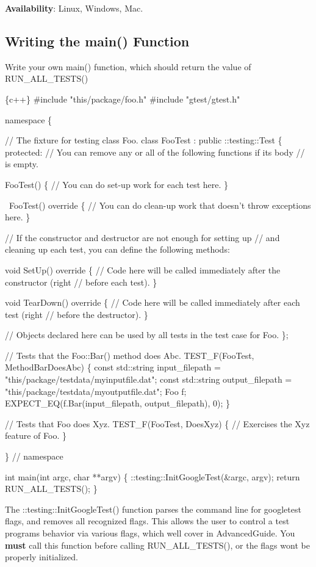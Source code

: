 {\bfseries Availability}\+: Linux, Windows, Mac.

\subsection*{Writing the main() Function}

Write your own main() function, which should return the value of {\ttfamily R\+U\+N\+\_\+\+A\+L\+L\+\_\+\+T\+E\+S\+T\+S()}


\begin{DoxyCode}
\{c++\}
#include "this/package/foo.h"
#include "gtest/gtest.h"

namespace \{

// The fixture for testing class Foo.
class FooTest : public ::testing::Test \{
 protected:
  // You can remove any or all of the following functions if its body
  // is empty.

  FooTest() \{
     // You can do set-up work for each test here.
  \}

  ~FooTest() override \{
     // You can do clean-up work that doesn't throw exceptions here.
  \}

  // If the constructor and destructor are not enough for setting up
  // and cleaning up each test, you can define the following methods:

  void SetUp() override \{
     // Code here will be called immediately after the constructor (right
     // before each test).
  \}

  void TearDown() override \{
     // Code here will be called immediately after each test (right
     // before the destructor).
  \}

  // Objects declared here can be used by all tests in the test case for Foo.
\};

// Tests that the Foo::Bar() method does Abc.
TEST\_F(FooTest, MethodBarDoesAbc) \{
  const std::string input\_filepath = "this/package/testdata/myinputfile.dat";
  const std::string output\_filepath = "this/package/testdata/myoutputfile.dat";
  Foo f;
  EXPECT\_EQ(f.Bar(input\_filepath, output\_filepath), 0);
\}

// Tests that Foo does Xyz.
TEST\_F(FooTest, DoesXyz) \{
  // Exercises the Xyz feature of Foo.
\}

\}  // namespace

int main(int argc, char **argv) \{
  ::testing::InitGoogleTest(&argc, argv);
  return RUN\_ALL\_TESTS();
\}
\end{DoxyCode}


The {\ttfamily \+::testing\+::\+Init\+Google\+Test()} function parses the command line for googletest flags, and removes all recognized flags. This allows the user to control a test program\textquotesingle{}s behavior via various flags, which we\textquotesingle{}ll cover in Advanced\+Guide. You {\bfseries must} call this function before calling {\ttfamily R\+U\+N\+\_\+\+A\+L\+L\+\_\+\+T\+E\+S\+T\+S()}, or the flags won\textquotesingle{}t be properly initialized.


